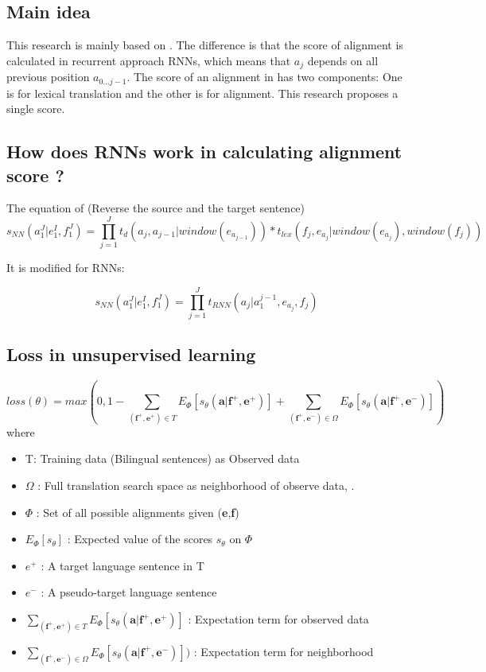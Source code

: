 \documentclass{article}
\begin{document}
\subsection{Main idea}
This research is mainly based on \citep{Yang13word}. The difference is that the score of alignment is calculated in recurrent approach RNNs, which means that $a_j$ depends on all previous position $a_{0...j-1}$.
The score of an alignment in \citep{Yang13word} has two components: One is for lexical translation and the other is for alignment. This research proposes a single score.

\subsection{How does RNNs work in calculating alignment score ?}

The equation of \citep{Yang13word} (Reverse the source and the target sentence)
\begin{equation}
s_{NN}(a_1^ J|e_1^ I, f_1^ J) = \prod_{j = 1}^{J} t_{d}(a_{j},a_{j-1}|window(e_{a_{j-1}})) *t_{lex}(f_{j},e_{a_{j}}|window(e_{a_{j}}), window(f_{j}))
\end{equation}

It is modified for RNNs:

\begin{equation}
s_{NN}(a_1^ J|e_1^ I, f_1^ J) = \prod_{j = 1}^{J} t_{RNN}(a_{j}|a_1^{j-1},e_{a_{j}},f_j  )
\label{Tamura14recurrent Alignment score}
\end{equation}

\subsection{Loss in unsupervised learning} 
\begin{equation}
loss(\theta) = max(0 , 1 - \sum_{(\textbf{f}^+,\textbf{e}^+) \in T} E_{\Phi} [s_{\theta} (\textbf{a}|\textbf{f}^+, \textbf{e}^+)]  + \sum_{(\textbf{f}^+,\textbf{e}^-) \in \Omega} E_{\Phi} [s_{\theta} (\textbf{a}|\textbf{f}^+, \textbf{e}^-)] )
\label{Tamura14recurrent Loss Unsupervised Learning}
\end{equation}
where
\begin{itemize}
\item T: Training data (Bilingual sentences) as Observed data
\item $\Omega$ : Full translation search space as neighborhood of observe data, .
\item $\Phi$ : Set of all possible alignments given (\textbf{e},\textbf{f})
\item $E_{\Phi} [s_{\theta}]$ : Expected value of the scores $s_\theta$ on $\Phi$
\item $e^+$ : A target language sentence in T
\item $e^-$ : A pseudo-target language sentence
\item $\sum_{(\textbf{f}^+,\textbf{e}^+) \in T} E_{\Phi} [s_{\theta} (\textbf{a}|\textbf{f}^+, \textbf{e}^+)]$ : Expectation term for observed data
\item$ \sum_{(\textbf{f}^+,\textbf{e}^-) \in \Omega} E_{\Phi} [s_{\theta} (\textbf{a}|\textbf{f}^+, \textbf{e}^-)] )$ : Expectation term for neighborhood
\end{itemize}
\end{document}
